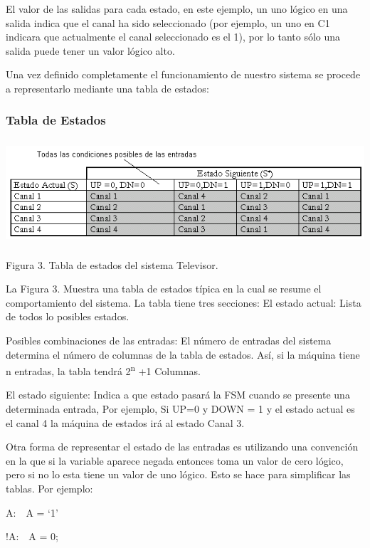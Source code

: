 El valor de las salidas para cada estado, en este ejemplo, un uno lógico en una salida indica que el canal ha sido seleccionado (por ejemplo, un
uno en C1 indicara que actualmente el canal seleccionado es el 1), por lo tanto sólo una salida puede tener un valor lógico alto.

Una vez definido completamente el funcionamiento de nuestro sistema se procede  a representarlo mediante una tabla de estados:

\subsubsection[Tabla de Estados]{ Tabla de Estados}
{\centering 
\includegraphics[width=14.991cm,height=3.895cm]{./images/FSM-img3.png} \par}

{\centering
Figura 3. Tabla de estados del sistema Televisor.
\par}

La Figura 3. Muestra una tabla de estados típica en la cual se resume el comportamiento del sistema. La tabla tiene tres secciones: El estado actual: Lista de todos lo posibles estados.

Posibles combinaciones de las entradas: El número de entradas del sistema determina el número de columnas de la tabla de estados. Así, si la máquina tiene n entradas, la tabla tendrá 2\textsuperscript{n} +1 Columnas.

El estado siguiente: Indica a que estado pasará la FSM cuando se presente una determinada entrada, Por ejemplo, Si UP=0 y DOWN = 1 y el estado actual es el canal 4 la máquina de estados irá al estado Canal 3.

Otra forma de representar el estado de las entradas es utilizando una convención en la que si la variable aparece negada entonces toma un valor de cero lógico, pero si no lo esta tiene un valor de uno lógico. Esto se hace para simplificar las tablas. Por ejemplo:


A:\ \ A = {\textquoteleft}1{\textquoteright}

{!A:\ \ A = 0;}

